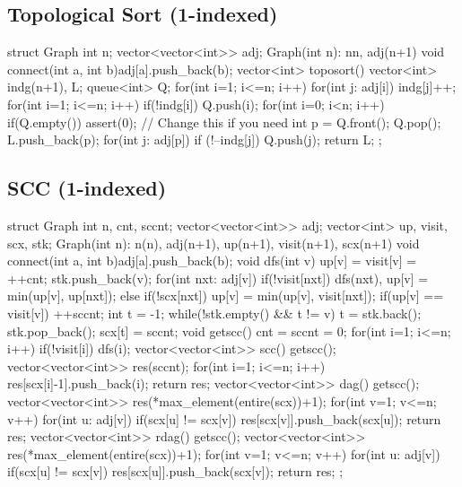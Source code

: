 \subsection{Topological Sort (1-indexed)}
\begin{cpp}
struct Graph{
  int n; vector<vector<int>> adj;
  Graph(int n): n{n}, adj(n+1) {}
  void connect(int a, int b){adj[a].push_back(b);}
  vector<int> toposort(){
    vector<int> indg(n+1), L;
    queue<int> Q;
    for(int i=1; i<=n; i++) for(int j: adj[i]) indg[j]++;
    for(int i=1; i<=n; i++) if(!indg[i]) Q.push(i);
    for(int i=0; i<n; i++){
      if(Q.empty()) assert(0); // Change this if you need
      int p = Q.front(); Q.pop();
      L.push_back(p);
      for(int j: adj[p]) if (!--indg[j]) Q.push(j);
    }
    return L;
  }
};
\end{cpp}

\subsection{SCC (1-indexed)}
\begin{cpp}
struct Graph{
  int n, cnt, sccnt; vector<vector<int>> adj;
  vector<int> up, visit, scx, stk;
  Graph(int n): n(n), adj(n+1),
    up(n+1), visit(n+1), scx(n+1) {}
  void connect(int a, int b){adj[a].push_back(b);}
  void dfs(int v){
    up[v] = visit[v] = ++cnt;
    stk.push_back(v);
    for(int nxt: adj[v]){
      if(!visit[nxt]) dfs(nxt), up[v] = min(up[v], up[nxt]);
      else if(!scx[nxt]) up[v] = min(up[v], visit[nxt]);
    }
    if(up[v] == visit[v]){
      ++sccnt; int t = -1;
      while(!stk.empty() && t != v){
        t = stk.back(); stk.pop_back();
        scx[t] = sccnt;
      }
    }
  }
  void getscc(){
    cnt = sccnt = 0;
    for(int i=1; i<=n; i++) if(!visit[i]) dfs(i);
  }
  vector<vector<int>> scc(){
    getscc();
    vector<vector<int>> res(sccnt);
    for(int i=1; i<=n; i++) res[scx[i]-1].push_back(i);
    return res;
  }
  vector<vector<int>> dag(){
    getscc();
    vector<vector<int>> res(*max_element(entire(scx))+1);
    for(int v=1; v<=n; v++){
      for(int u: adj[v]) if(scx[u] != scx[v]) 
        res[scx[v]].push_back(scx[u]);
    }
    return res;
  }
  vector<vector<int>> rdag(){
    getscc();
    vector<vector<int>> res(*max_element(entire(scx))+1);
    for(int v=1; v<=n; v++){
      for(int u: adj[v]) if(scx[u] != scx[v]) 
        res[scx[u]].push_back(scx[v]);
    }
    return res;
  }
};
\end{cpp}

